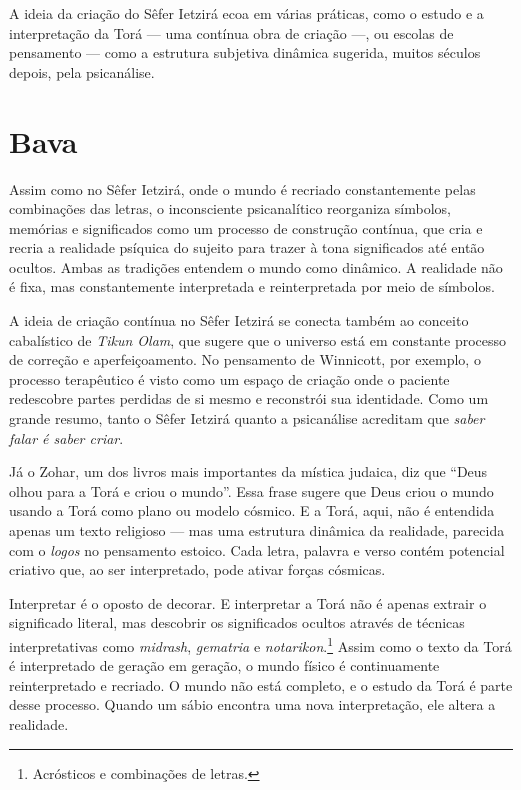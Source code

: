 A ideia da criação do Sêfer Ietzirá ecoa em várias práticas, como o estudo e a interpretação da Torá --- uma contínua obra de criação ---, ou escolas de pensamento --- como a estrutura subjetiva dinâmica sugerida, muitos séculos depois, pela psicanálise. 

\chapter*{Bava \smallskip{}}

Assim como no Sêfer Ietzirá, onde o mundo é recriado constantemente pelas combinações das letras, o inconsciente psicanalítico reorganiza símbolos, memórias e significados como um processo de construção contínua, que cria e recria a realidade psíquica do sujeito para trazer à tona significados até então ocultos. Ambas as tradições entendem o mundo como dinâmico. A realidade não é fixa, mas constantemente interpretada e reinterpretada por meio de símbolos. 

A ideia de criação contínua no Sêfer Ietzirá se conecta também ao conceito cabalístico de \textit{Tikun Olam}, que sugere que o universo está em constante processo de correção e aperfeiçoamento. No pensamento de Winnicott, por exemplo, o processo terapêutico é visto como um espaço de criação onde o paciente redescobre partes perdidas de si mesmo e reconstrói sua identidade. Como um grande resumo, tanto o Sêfer Ietzirá quanto a psicanálise acreditam que \textit{saber falar é saber criar}.


Já o Zohar, um dos livros mais importantes da mística judaica, diz que ``Deus olhou para a Torá e criou o mundo''. Essa frase sugere que Deus criou o mundo usando a Torá como plano ou modelo cósmico. E a Torá, aqui, não é entendida apenas um texto religioso --- mas uma estrutura dinâmica da realidade, parecida com o \textit{logos} no pensamento estoico. Cada letra, palavra e verso contém potencial criativo que, ao ser interpretado, pode ativar forças cósmicas.

Interpretar é o oposto de decorar. E interpretar a Torá não é apenas extrair o significado literal, mas descobrir os significados ocultos através de técnicas interpretativas como \textit{midrash}, \textit{gematria} e \textit{notarikon}.\footnote{Acrósticos e combinações de letras.} Assim como o texto da Torá é interpretado de geração em geração, o mundo físico é continuamente reinterpretado e recriado. O mundo não está completo, e o estudo da Torá é parte desse processo. Quando um sábio encontra uma nova interpretação, ele altera a realidade.

